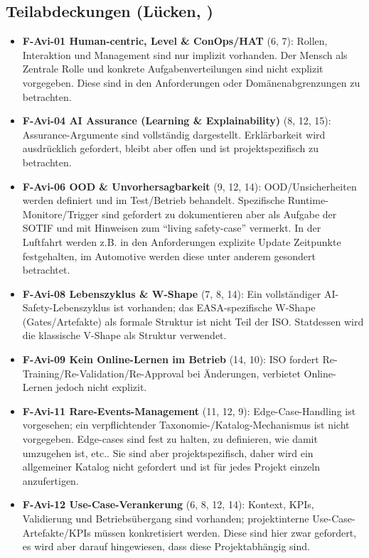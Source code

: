 \subsection{Teilabdeckungen (Lücken, \covT)}
\begin{itemize}
  \item \textbf{F-Avi-01 Human-centric, Level \& ConOps/HAT} (6, 7): Rollen, Interaktion und Management sind nur implizit vorhanden. Der Mensch als Zentrale Rolle und konkrete Aufgabenverteilungen sind nicht explizit vorgegeben. Diese sind in den Anforderungen oder Domänenabgrenzungen zu betrachten.
  \item \textbf{F-Avi-04 AI Assurance (Learning \& Explainability)} (8, 12, 15): Assurance-Argumente sind vollständig dargestellt. Erklärbarkeit wird ausdrücklich gefordert, bleibt aber offen und ist projektspezifisch zu betrachten.
  \item \textbf{F-Avi-06 OOD \& Unvorhersagbarkeit} (9, 12, 14): OOD/Unsicherheiten werden definiert und im Test/Betrieb behandelt. Spezifische Runtime-Monitore/Trigger sind gefordert zu dokumentieren aber als Aufgabe der SOTIF und mit Hinweisen zum ``living safety-case'' vermerkt. In der Luftfahrt werden z.B. in den Anforderungen explizite Update Zeitpunkte festgehalten, im Automotive werden diese unter anderem gesondert betrachtet.
  \item \textbf{F-Avi-08 Lebenszyklus \& W-Shape} (7, 8, 14): Ein vollständiger AI-Safety-Lebenszyklus ist vorhanden; das EASA-spezifische W-Shape (Gates/Artefakte) als formale Struktur ist nicht Teil der ISO. Statdessen wird die klassische V-Shape als Struktur verwendet.
  \item \textbf{F-Avi-09 Kein Online-Lernen im Betrieb} (14, 10): ISO fordert Re-Training/Re-Validation/Re-Approval bei Änderungen, verbietet Online-Lernen jedoch nicht explizit.
  \item \textbf{F-Avi-11 Rare-Events-Management} (11, 12, 9): Edge-Case-Handling ist vorgesehen; ein verpflichtender Taxonomie-/Katalog-Mechanismus ist nicht vorgegeben. Edge-cases sind fest zu halten, zu definieren, wie damit umzugehen ist, etc.. Sie sind aber projektspezifisch, daher wird ein allgemeiner Katalog nicht gefordert und ist für jedes Projekt einzeln anzufertigen.
  \item \textbf{F-Avi-12 Use-Case-Verankerung} (6, 8, 12, 14): Kontext, KPIs, Validierung und Betriebsübergang sind vorhanden; projektinterne Use-Case-Artefakte/KPIs müssen konkretisiert werden. Diese sind hier zwar gefordert, es wird aber darauf hingewiesen, dass diese Projektabhängig sind.
\end{itemize}

